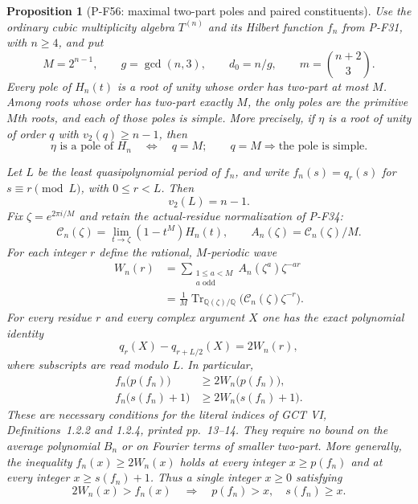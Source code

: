 \documentclass[11pt,a4paper]{article}
\newtheorem{proposition}{Proposition}[section]
\begin{document}
\begin{proposition}[P-F56: maximal two-part poles and paired constituents]
\label{prop:cubicpairedwave}
Use the ordinary cubic multiplicity algebra $T^{(n)}$ and its
Hilbert function $f_n$ from P-F31, with $n\ge4$, and put
\[
 M=2^{n-1},\qquad g=\gcd(n,3),\qquad d_0=n/g,
 \qquad m=\binom{n+2}{3}.
\]
Every pole of $H_n(t)$ is a root of unity whose order has
two-part at most $M$. Among roots whose order has two-part exactly
$M$, the only poles are the primitive $M$th roots, and each of
those poles is simple. More precisely, if $\eta$ is a root of
unity of order $q$ with $v_2(q)\ge n-1$, then
\[
 \eta\text{ is a pole of }H_n
       \quad\Longleftrightarrow\quad q=M;
 \qquad q=M\Longrightarrow\text{the pole is simple}.
 \tag{P-F56a}
\]

Let $L$ be the least quasipolynomial period of $f_n$, and write
$f_n(s)=q_r(s)$ for $s\equiv r\pmod L$, with
$0\le r<L$. Then
\[
                     v_2(L)=n-1.                            \tag{P-F56b}
\]
Fix $\zeta=e^{2\pi i/M}$ and retain the actual-residue
normalization of P-F34:
\[
 \mathcal C_n(\zeta)=\lim_{t\to\zeta}(1-t^M)H_n(t),
 \qquad A_n(\zeta)=\mathcal C_n(\zeta)/M.
\]
For each integer $r$ define the rational, $M$-periodic wave
\[
 \begin{split}
 W_n(r)
   &=\sum_{\substack{1\le a<M\\a\text{ odd}}}
                      A_n(\zeta^a)\zeta^{-ar}\\
   &=\frac1M\operatorname{Tr}_{\mathbb Q(\zeta)/\mathbb Q}
                  \bigl(\mathcal C_n(\zeta)\zeta^{-r}\bigr).
 \end{split}                                                 \tag{P-F56c}
\]
For every residue $r$ and every complex argument $X$ one has
the exact polynomial identity
\[
               q_r(X)-q_{r+L/2}(X)=2W_n(r),                 \tag{P-F56d}
\]
where subscripts are read modulo $L$. In particular,
\[
 \begin{split}
 f_n\bigl(p(f_n)\bigr)&\ge2W_n\bigl(p(f_n)\bigr),\\
 f_n\bigl(s(f_n)+1\bigr)&\ge2W_n\bigl(s(f_n)+1\bigr).
 \end{split}                                                 \tag{P-F56e}
\]
These are necessary conditions for the literal indices of
GCT VI, Definitions~1.2.2 and 1.2.4, printed pp.~13--14.
They require no bound on the average polynomial $B_n$ or on
Fourier terms of smaller two-part.
More generally, the inequality $f_n(x)\ge2W_n(x)$ holds
at every integer $x\ge p(f_n)$ and at every integer
$x\ge s(f_n)+1$. Thus a single integer $x\ge0$ satisfying
\[
          2W_n(x)>f_n(x)
       \quad\Longrightarrow\quad p(f_n)>x,
                                  \quad s(f_n)\ge x.
 \tag{P-F56e'}
\]


\end{proposition}
\end{document}
